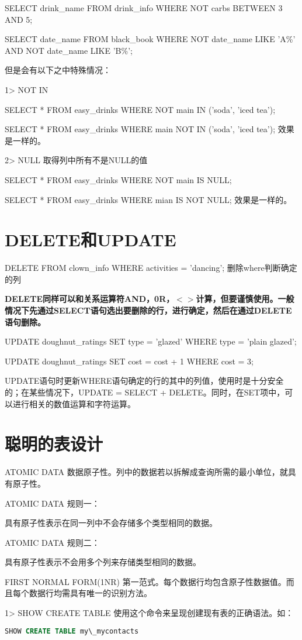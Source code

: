 \documentclass[UTF8]{ctexart}
\begin{document}
SELECT drink\_name FROM drink\_info WHERE NOT carbs BETWEEN 3 AND 5;

SELECT date\_name FROM black\_book WHERE NOT date\_name LIKE 'A\%' AND NOT date\_name LIKE 'B\%';

但是会有以下之中特殊情况：

1> NOT IN

SELECT * FROM easy\_drinks WHERE NOT main IN ('soda', 'iced tea');

SELECT * FROM easy\_drinks WHERE main NOT IN ('soda', 'iced tea'); 效果是一样的。

2> NULL 取得列中所有不是NULL的值

SELECT * FROM easy\_drinks WHERE NOT main IS NULL;

SELECT * FROM easy\_drinks WHERE mian IS NOT NULL; 效果是一样的。
\section{DELETE和UPDATE}
DELETE FROM clown\_info WHERE activities = 'dancing'; 删除where判断确定的列

\textbf{DELETE同样可以和关系运算符AND，0R，$<>$计算，但要谨慎使用。一般情况下先通过SELECT语句选出要删除的行，进行确定，然后在通过DELETE语句删除。}

UPDATE doughnut\_ratings SET type = 'glazed' WHERE type = 'plain glazed';

UPDATE doughnut\_ratings SET cost = cost + 1 WHERE cost = 3;

UPDATE语句时更新WHERE语句确定的行的其中的列值，使用时是十分安全的；在某些情况下，UPDATE = SELECT + DELETE。同时，在SET项中，可以进行相关的数值运算和字符运算。
\section{聪明的表设计}

ATOMIC DATA 数据原子性。列中的数据若以拆解成查询所需的最小单位，就具有原子性。

ATOMIC DATA 规则一：

具有原子性表示在同一列中不会存储多个类型相同的数据。

ATOMIC DATA 规则二：

具有原子性表示不会用多个列来存储类型相同的数据。

FIRST NORMAL FORM(1NR) 第一范式。每个数据行均包含原子性数据值。而且每个数据行均需具有唯一的识别方法。

1> SHOW CREATE TABLE 使用这个命令来呈现创建现有表的正确语法。如：
\begin{lstlisting}[language = SQL]
SHOW CREATE TABLE my\_mycontacts
\end{lstlisting}
\end{document}

